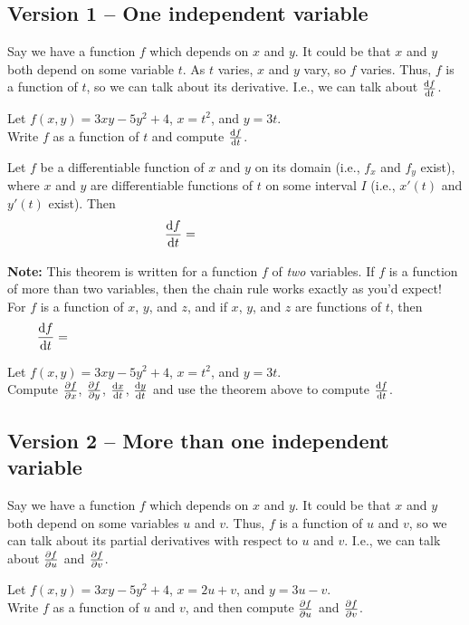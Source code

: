 \subsection{Version 1 -- One independent variable}
Say we have a function $f$ which depends on $x$ and $y$. It could be that $x$ and $y$ both depend on some variable $t$. As $t$ varies, $x$ and $y$ vary, so $f$ varies. Thus, $f$ is a function of $t$, so we can talk about its derivative. I.e., we can talk about $\frac{\mathop{}\!\mathrm{d} f}{\mathop{}\!\mathrm{d} t}$.
\begin{ex}
Let $f(x,y)=3xy-5y^2+4$, \quad $x=t^2$, \quad and $y=3t$. \\

Write $f$ as a function of $t$ and compute $\frac{\mathop{}\!\mathrm{d} f}{\mathop{}\!\mathrm{d} t}$.
\end{ex}
\vfill

\begin{thm}
Let $f$ be a differentiable function of $x$ and $y$ on its domain (i.e., $f_x$ and $f_y$ exist), where $x$ and $y$ are differentiable functions of $t$ on some interval $I$ (i.e., $x'(t)$ and $y'(t)$ exist). Then 
\[
    \dfd{f}{t}=\phantom{\pfp{f}{x}\cdot\dfd{x}{t}+\pfp{f}{y}\cdot\dfd{y}{t}.}
\]
\end{thm}
\noindent \textbf{Note:} This theorem is written for a function $f$ of \emph{two} variables. If $f$ is a function of more than two variables, then the chain rule works exactly as you'd expect! For $f$ is a function of $x$, $y$, and $z$, and if $x$, $y$, and $z$ are functions of $t$, then 
\[\dfd{f}{t} = \hspace{4in}\]

\begin{ex}
Let $f(x,y)=3xy-5y^2+4$, \quad $x=t^2$, \quad and $y=3t$. \\

Compute $\frac{\partial f}{\partial x}$, $\frac{\partial f}{\partial y}$, $\frac{\mathop{}\!\mathrm{d} x}{\mathop{}\!\mathrm{d} t}$, $\frac{\mathop{}\!\mathrm{d} y}{\mathop{}\!\mathrm{d} t}$ and use the theorem above to compute $\frac{\mathop{}\!\mathrm{d} f}{\mathop{}\!\mathrm{d} t}$.
\end{ex}
\vfill
\pagebreak 
\subsection{Version 2 -- More than one independent variable}
Say we have a function $f$ which depends on $x$ and $y$. It could be that $x$ and $y$ both depend on some variables $u$ and $v$. Thus, $f$ is a function of $u$ and $v$, so we can talk about its partial derivatives with respect to $u$ and $v$. I.e., we can talk about $\frac{\partial f}{\partial u}$ and $\frac{\partial f}{\partial v}$.
\begin{ex}
Let $f(x,y)=3xy-5y^2+4$, \quad $x=2u+v$, \quad and $y=3u-v$.\\

Write $f$ as a function of $u$ and $v$, and then compute $\frac{\partial f}{\partial u}$ and $\frac{\partial f}{\partial v}$.
\end{ex}
\vfill

